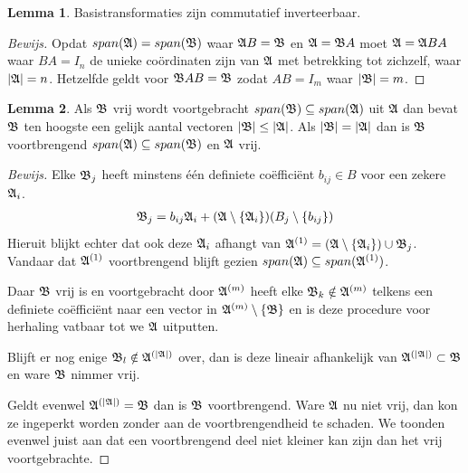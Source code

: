 \documentclass{amsart}
\theoremstyle{definition}
\newtheorem{lmm}{Lemma}[section]
\newenvironment{bewijs}{\begin{proof}[Bewijs]}{\end{proof}}
\newcommand{\setsm}[1]{\{{#1}\}}
\newcommand{\without}[1]{\setminus\setsm{#1}}
\newcommand{\abs}[1]{\lvert{#1}\rvert}
\newcommand{\vecrow}[1][a]{\mathfrak{\MakeUppercase{#1}}}
\newcommand{\rvec}[2][i]{{#2}_{#1}}
\newcommand{\rvecr}[2][i]{\rvec[#1]{\vecrow[#2]}}
\begin{document}
\begin{lmm}
    Basistransformaties zijn commutatief inverteerbaar.
    \begin{bewijs}
        Opdat $span(\vecrow) = span(\vecrow[b])$ waar $\vecrow B = \vecrow[b]$ en $\vecrow = \vecrow[b] A$ moet $\vecrow = \vecrow BA$ waar $BA = I_n$ de unieke coördinaten zijn van $\vecrow$ met betrekking tot zichzelf, waar $\abs{\vecrow} = n$. Hetzelfde geldt voor $\vecrow[b] AB = \vecrow[b]$ zodat $AB = I_m$ waar $\abs{\vecrow[B]} = m$.
    \end{bewijs}
\end{lmm}

\begin{lmm}
    Als $\vecrow[b]$ vrij wordt voortgebracht $span(\vecrow[b]) \subseteq span(\vecrow)$ uit $\vecrow$ dan bevat $\vecrow[b]$ ten hoogste een gelijk aantal vectoren $\abs{\vecrow[b]} \leq \abs\vecrow$.
    Als $\abs{\vecrow[b]} = \abs\vecrow$ dan is $\vecrow[b]$ voortbrengend $span(\vecrow) \subseteq span(\vecrow[b])$ en $\vecrow$ vrij.
    \begin{bewijs}
        Elke $\vecrow[b]_j$ heeft minstens één definiete coëfficiënt $b_{ij} \in B$ voor een zekere $\vecrow_i$.
        \begin{align*}
            \vecrow[b]_j = b_{ij}\vecrow_i + (\vecrow \without{\vecrow_i})(B_j  \without{b_{ij}})
        \end{align*}
        Hieruit blijkt echter dat ook deze $\vecrow_i$ afhangt van  $\vecrow^{(1)} = \left(\vecrow \without{\vecrow_i}\right) \cup \rvecr[j]{b}$.
        Vandaar dat $\vecrow^{(1)}$ voortbrengend blijft gezien $span(\vecrow) \subseteq span(\vecrow^{(1)})$.

        Daar $\vecrow[b]$ vrij is en voortgebracht door $\vecrow^{(m)}$ heeft elke $\rvecr[k]{b} \notin \vecrow^{(m)}$ telkens een definiete coëfficiënt naar een vector in $\vecrow^{(m)}\without{\vecrow[b]}$
        en is deze procedure voor herhaling vatbaar tot we $\vecrow$ uitputten.

        Blijft er nog enige $\vecrow[b]_l \notin \vecrow^{(\abs{\vecrow})}$ over,
        dan is deze lineair afhankelijk van $\vecrow^{(\abs\vecrow)} \subset \vecrow[b]$ en ware $\vecrow[b]$ nimmer vrij.

        Geldt evenwel $\vecrow^{(\abs{\vecrow})} = \vecrow[b]$ dan is $\vecrow[b]$ voortbrengend.
        Ware $\vecrow$ nu niet vrij, dan kon ze ingeperkt worden zonder aan de voortbrengendheid te schaden.
        We toonden evenwel juist aan dat een voortbrengend deel niet kleiner kan zijn dan het vrij voortgebrachte.
    \end{bewijs}
\end{lmm}
\end{document}
